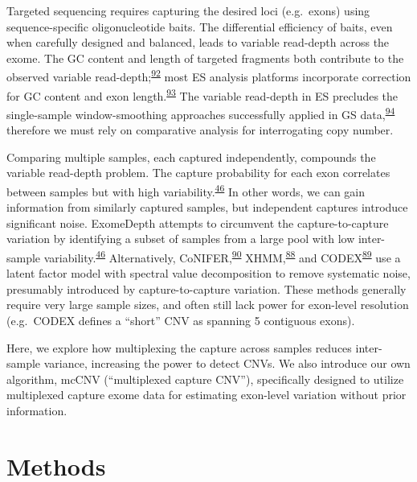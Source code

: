 \documentclass[11pt,letterpaper,oneside]{book}
\begin{document}
Targeted sequencing requires capturing the desired loci (e.g.~exons) using sequence-specific oligonucleotide baits.
The differential efficiency of baits, even when carefully designed and balanced, leads to variable read-depth across the exome.
The GC content and length of targeted fragments both contribute to the observed variable read-depth;\textsuperscript{\protect\hyperlink{ref-benjamini:2012aa}{92}} most ES analysis platforms incorporate correction for GC content and exon length.\textsuperscript{\protect\hyperlink{ref-kadalayil:2015aa}{93}}
The variable read-depth in ES precludes the single-sample window-smoothing approaches successfully applied in GS data,\textsuperscript{\protect\hyperlink{ref-chiang:2009aa}{94}} therefore we must rely on comparative analysis for interrogating copy number.

Comparing multiple samples, each captured independently, compounds the variable read-depth problem.
The capture probability for each exon correlates between samples but with high variability.\textsuperscript{\protect\hyperlink{ref-plagnol:2012aa}{46}}
In other words, we can gain information from similarly captured samples, but independent captures introduce significant noise.
ExomeDepth attempts to circumvent the capture-to-capture variation by identifying a subset of samples from a large pool with low inter-sample variability.\textsuperscript{\protect\hyperlink{ref-plagnol:2012aa}{46}}
Alternatively, CoNIFER,\textsuperscript{\protect\hyperlink{ref-krumm:2012aa}{90}} XHMM,\textsuperscript{\protect\hyperlink{ref-fromer:2012aa}{88}} and CODEX\textsuperscript{\protect\hyperlink{ref-jiang:2015aa}{89}} use a latent factor model with spectral value decomposition to remove systematic noise, presumably introduced by capture-to-capture variation.
These methods generally require very large sample sizes, and often still lack power for exon-level resolution (e.g.~CODEX defines a ``short'' CNV as spanning 5 contiguous exons).

Here, we explore how multiplexing the capture across samples reduces inter-sample variance, increasing the power to detect CNVs.
We also introduce our own algorithm, mcCNV (``multiplexed capture CNV''), specifically designed to utilize multiplexed capture exome data for estimating exon-level variation without prior information.

\hypertarget{methods}{%
\section{Methods}\label{methods}}
\end{document}
